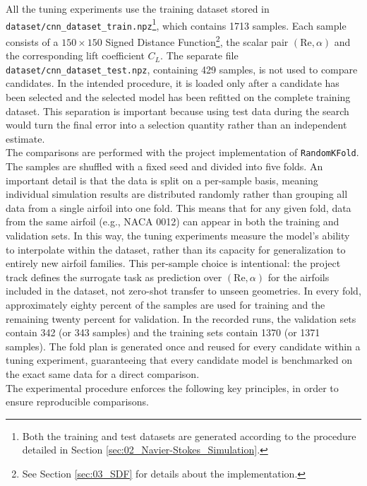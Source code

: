 All the tuning experiments use the training dataset stored in \texttt{dataset/cnn\_dataset\_train.npz}\footnote{Both the training and test datasets are generated according to the procedure detailed in Section \ref{sec:02_Navier-Stokes_Simulation}.}, which contains 1713 samples. Each sample consists of a $150\times150$ Signed Distance Function\footnote{See Section \ref{sec:03_SDF} for details about the implementation.}, the scalar pair $(\mathrm{Re},\alpha)$ and the corresponding lift coefficient $C_L$. The separate file \texttt{dataset/cnn\_dataset\_test.npz}, containing 429 samples, is not used to compare candidates. In the intended procedure, it is loaded only after a candidate has been selected and the selected model has been refitted on the complete training dataset. This separation is important because using test data during the search would turn the final error into a selection quantity rather than an independent estimate.\\

The comparisons are performed with the project implementation of \texttt{RandomKFold}. The samples are shuffled with a fixed seed and divided into five folds. An important detail is that the data is split on a per-sample basis, meaning individual simulation results are distributed randomly rather than grouping all data from a single airfoil into one fold. This means that for any given fold, data from the same airfoil (e.g., NACA 0012) can appear in both the training and validation sets. In this way, the tuning experiments measure the model's ability to interpolate within the dataset, rather than its capacity for generalization to entirely new airfoil families. This per-sample choice is intentional: the project track defines the surrogate task as prediction over $(\mathrm{Re},\alpha)$ for the airfoils included in the dataset, not zero-shot transfer to unseen geometries. In every fold, approximately eighty percent of the samples are used for training and the remaining twenty percent for validation. In the recorded runs, the validation sets contain 342 (or 343 samples) and the training sets contain 1370 (or 1371 samples). The fold plan is generated once and reused for every candidate within a tuning experiment, guaranteeing that every candidate model is benchmarked on the exact same data for a direct comparison.\\

The experimental procedure enforces the following key principles, in order to ensure reproducible comparisons.\\

